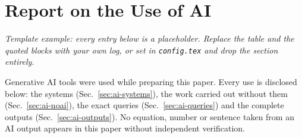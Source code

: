 
\section{Report on the Use of AI}
\label{sec:ai-report}

\noindent\emph{Template example: every entry below is a placeholder. Replace
the table and the quoted blocks with your own log, or set \aiusedfalse{} in
\texttt{config.tex} and drop the section entirely.}\par\smallskip
Generative AI tools were used while preparing this paper. Every use is
disclosed below: the systems (Sec.~\ref{sec:ai-systems}), the work carried
out without them (Sec.~\ref{sec:ai-noai}), the exact queries
(Sec.~\ref{sec:ai-queries}) and the complete outputs
(Sec.~\ref{sec:ai-outputs}). No equation, number or sentence taken from an
AI output appears in this paper without independent verification.

